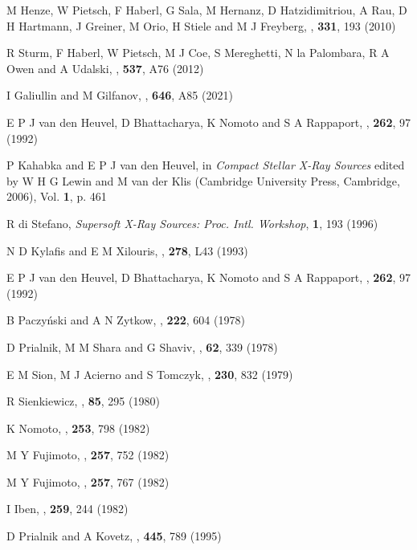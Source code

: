 \begin{thebibliography}{100}
	M Henze, W Pietsch, F Haberl, G Sala, M Hernanz, D Hatzidimitriou, A Rau, D H Hartmann, J Greiner, M Orio, H Stiele and M J Freyberg, \textit{\ANAN}, \textbf{331}, 193 (2010)

	R Sturm, F Haberl, W Pietsch, M J Coe, S Mereghetti, N la Palombara,
R A Owen and A Udalski, \textit{\AnA}, \textbf{537}, A76 (2012)

	I Galiullin and M Gilfanov, \textit{\AnA}, \textbf{646}, A85 (2021)
	
	E P J van den Heuvel, D Bhattacharya, K Nomoto and S A Rappaport, \textit{\AnA}, \textbf{262}, 97 (1992)
	
	P Kahabka and E P J van den Heuvel, in \textit{Compact Stellar X-Ray Sources} edited by W H G Lewin and M van der Klis (Cambridge University Press, Cambridge, 2006), Vol. \textbf{1}, p. 461
	
	R di Stefano, \textit{Supersoft X-Ray Sources: Proc. Intl. Workshop}, \textbf{1}, 193 (1996)
	
	N D Kylafis and E M Xilouris, \textit{\AnA}, \textbf{278}, L43 (1993)

	E P J van den Heuvel, D Bhattacharya, K Nomoto and S A Rappaport, \textit{\AnA}, \textbf{262}, 97 (1992)
	
	B Paczy{\'n}ski and A N Zytkow, \textit{\ApJ}, \textbf{222}, 604 (1978)
	
	D Prialnik, M M Shara and G Shaviv, \textit{\AnA}, \textbf{62}, 339 (1978)

	E M Sion, M J Acierno and S Tomczyk, \textit{\ApJ}, \textbf{230}, 832 (1979)

	R Sienkiewicz, \textit{\AnA}, \textbf{85}, 295 (1980)
	
	K Nomoto, \textit{\ApJ}, \textbf{253}, 798 (1982)
	
	M Y Fujimoto, \textit{\ApJ}, \textbf{257}, 752 (1982)
	
	M Y Fujimoto, \textit{\ApJ}, \textbf{257}, 767 (1982)
	
	I Iben, \textit{\ApJ}, \textbf{259}, 244 (1982)

	D Prialnik and A Kovetz, \textit{\ApJ}, \textbf{445}, 789 (1995)
	

\end{thebibliography}
